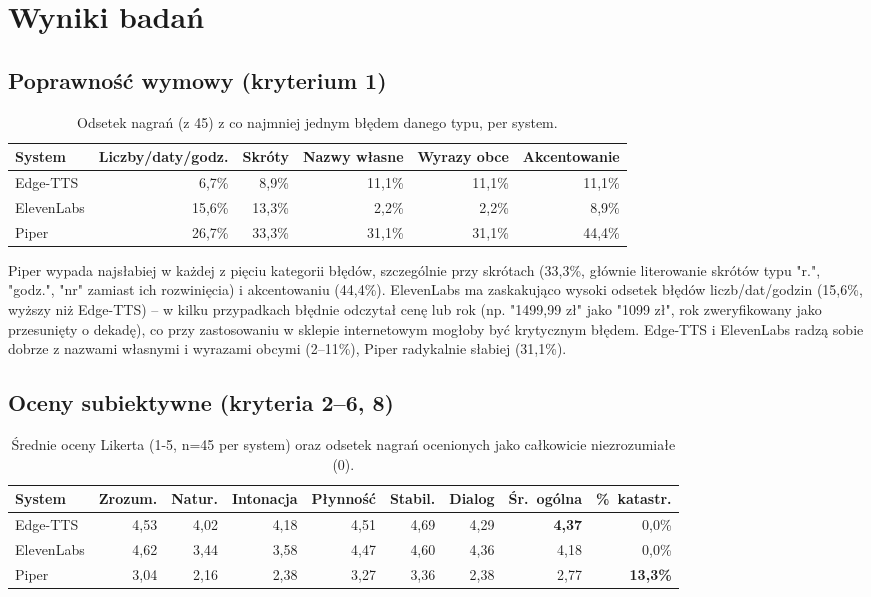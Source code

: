 \documentclass{article}
\begin{document}
\section{Wyniki badań}

\subsection{Poprawność wymowy (kryterium 1)}

\begin{table}[h]
\centering
\begin{tabular}{lrrrrr}
\toprule
System & Liczby/daty/godz. & Skróty & Nazwy własne & Wyrazy obce & Akcentowanie \\
\midrule
Edge-TTS    & 6,7\%  & 8,9\%  & 11,1\% & 11,1\% & 11,1\% \\
ElevenLabs  & 15,6\% & 13,3\% & 2,2\%  & 2,2\%  & 8,9\% \\
Piper       & 26,7\% & 33,3\% & 31,1\% & 31,1\% & 44,4\% \\
\bottomrule
\end{tabular}
\caption{Odsetek nagrań (z 45) z co najmniej jednym błędem danego typu, per system.}
\end{table}

Piper wypada najsłabiej w każdej z pięciu kategorii błędów, szczególnie przy skrótach
(33,3\%, głównie literowanie skrótów typu "r.", "godz.", "nr" zamiast ich rozwinięcia) i
akcentowaniu (44,4\%). ElevenLabs ma zaskakująco wysoki odsetek błędów liczb/dat/godzin
(15,6\%, wyższy niż Edge-TTS) -- w kilku przypadkach błędnie odczytał cenę lub rok (np. "1499,99
zł" jako "1099 zł", rok zweryfikowany jako przesunięty o dekadę), co przy zastosowaniu w
sklepie internetowym mogłoby być krytycznym błędem. Edge-TTS i ElevenLabs radzą sobie dobrze z
nazwami własnymi i wyrazami obcymi (2--11\%), Piper radykalnie słabiej (31,1\%).

\subsection{Oceny subiektywne (kryteria 2--6, 8)}

\begin{table}[h]
\centering
\begin{tabular}{lrrrrrrrr}
\toprule
System & Zrozum. & Natur. & Intonacja & Płynność & Stabil. & Dialog & Śr.~ogólna & \%~katastr. \\
\midrule
Edge-TTS   & 4,53 & 4,02 & 4,18 & 4,51 & 4,69 & 4,29 & \textbf{4,37} & 0,0\% \\
ElevenLabs & 4,62 & 3,44 & 3,58 & 4,47 & 4,60 & 4,36 & 4,18 & 0,0\% \\
Piper      & 3,04 & 2,16 & 2,38 & 3,27 & 3,36 & 2,38 & 2,77 & \textbf{13,3\%} \\
\bottomrule
\end{tabular}
\caption{Średnie oceny Likerta (1-5, n=45 per system) oraz odsetek nagrań ocenionych jako
całkowicie niezrozumiałe (0).}
\end{table}
\end{document}
